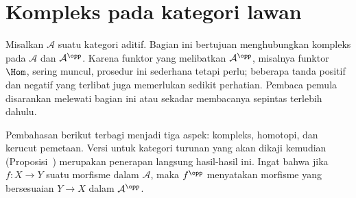 
\section{Kompleks pada kategori lawan}\label{sec:opposite-cplx}
\hypertarget{o014.aljabr2.chapter3.opposite-category-complexes}{ }

Misalkan $\mathcal{A}$ suatu kategori aditif. Bagian ini bertujuan
menghubungkan kompleks pada $\mathcal{A}$ dan $\mathcal{A}^{\opp}$. Karena
funktor yang melibatkan $\mathcal{A}^{\opp}$, misalnya funktor $\Hom$, sering
muncul, prosedur ini sederhana tetapi perlu; beberapa tanda positif dan
negatif yang terlibat juga memerlukan sedikit perhatian. Pembaca pemula
disarankan melewati bagian ini atau sekadar membacanya sepintas terlebih
dahulu.

Pembahasan berikut terbagi menjadi tiga aspek: kompleks, homotopi, dan kerucut
pemetaan. Versi untuk kategori turunan yang akan dikaji kemudian
(Proposisi~)
merupakan penerapan langsung hasil-hasil
ini. Ingat bahwa jika $f:X\to Y$ suatu morfisme dalam $\mathcal{A}$, maka
$f^{\opp}$ menyatakan morfisme yang bersesuaian $Y\to X$ dalam
$\mathcal{A}^{\opp}$.

